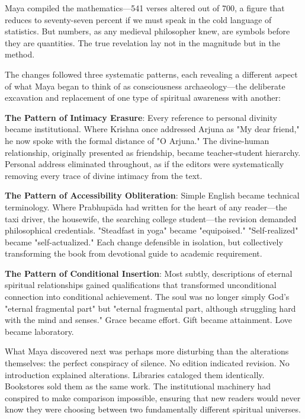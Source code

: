 \documentclass[11pt,twoside]{book}
\begin{document}
Maya compiled the mathematics—541 verses altered out of 700, a figure that reduces to seventy-seven percent if we must speak in the cold language of statistics. But numbers, as any medieval philosopher knew, are symbols before they are quantities. The true revelation lay not in the magnitude but in the method.

The changes followed three systematic patterns, each revealing a different aspect of what Maya began to think of as consciousness archaeology—the deliberate excavation and replacement of one type of spiritual awareness with another:

\textbf{\textbf{The Pattern of Intimacy Erasure}}: Every reference to personal divinity became institutional. Where Krishna once addressed Arjuna as "My dear friend," he now spoke with the formal distance of "O Arjuna." The divine-human relationship, originally presented as friendship, became teacher-student hierarchy. Personal address eliminated throughout, as if the editors were systematically removing every trace of divine intimacy from the text.

\textbf{\textbf{The Pattern of Accessibility Obliteration}}: Simple English became technical terminology. Where Prabhupāda had written for the heart of any reader—the taxi driver, the housewife, the searching college student—the revision demanded philosophical credentials. "Steadfast in yoga" became "equipoised." "Self-realized" became "self-actualized." Each change defensible in isolation, but collectively transforming the book from devotional guide to academic requirement.

\textbf{\textbf{The Pattern of Conditional Insertion}}: Most subtly, descriptions of eternal spiritual relationships gained qualifications that transformed unconditional connection into conditional achievement. The soul was no longer simply God's "eternal fragmental part" but "eternal fragmental part, although struggling hard with the mind and senses." Grace became effort. Gift became attainment. Love became laboratory.

What Maya discovered next was perhaps more disturbing than the alterations themselves: the perfect conspiracy of silence. No edition indicated revision. No introduction explained alterations. Libraries cataloged them identically. Bookstores sold them as the same work. The institutional machinery had conspired to make comparison impossible, ensuring that new readers would never know they were choosing between two fundamentally different spiritual universes.
\end{document}
